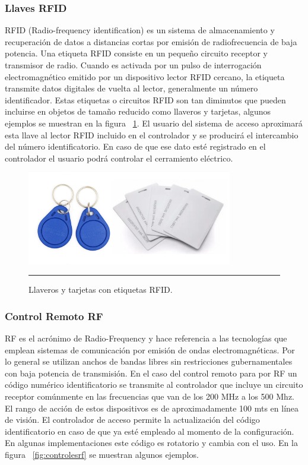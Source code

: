 \subsubsection{Llaves RFID}
RFID (Radio-frequency identification) es un sistema de almacenamiento y recuperación de datos a distancias cortas por emisión de radiofrecuencia de baja potencia. 
Una etiqueta RFID consiste en un pequeño circuito receptor y transmisor de radio. Cuando es activada por un pulso de interrogación electromagnético emitido por un dispositivo lector RFID cercano, la etiqueta transmite datos digitales de vuelta al lector, generalmente un número identificador.
Estas etiquetas o circuitos RFID son tan diminutos que pueden incluirse en objetos de tamaño reducido como llaveros y tarjetas, algunos ejemplos se muestran en la figura ~\ref{fig:llavesrfid}.
El usuario del sistema de acceso aproximará esta llave al lector RFID incluido en el controlador y se producirá el intercambio del número identificatorio. En caso de que ese dato esté registrado en el controlador el usuario podrá controlar el cerramiento eléctrico.

\begin{figure}[htbp]
	\centering
	\includegraphics[width=0.8\textwidth]{Pictures/llavesrfid.png}
	\rule{35em}{1pt}
	\caption[Llaves RFID]{Llaveros y tarjetas con etiquetas RFID. }
	\label{fig:llavesrfid}
\end{figure}

\subsubsection{Control Remoto RF}
RF es el acrónimo de Radio-Frequency y hace referencia a las tecnologías que emplean sistemas de comunicación por emisión de ondas electromagnéticas. Por lo general se utilizan anchos de bandas libres sin restricciones gubernamentales con baja potencia de transmisión.
En el caso del control remoto para por RF un código numérico identificatorio se transmite al controlador que incluye un circuito receptor comúnmente en las frecuencias que van de los 200 MHz a los 500 Mhz. El rango de acción de estos dispositivos es de aproximadamente 100 mts en línea de visión.
El controlador de acceso permite la actualización del código identificatorio en caso de que ya esté empleado al momento de la configuración. En algunas implementaciones este código es rotatorio y cambia con el uso.
En la figura ~\ref{fig:controlesrf} se muestran algunos ejemplos.


